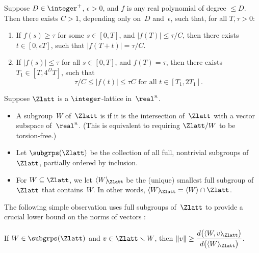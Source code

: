 \begin{lem} \label{ConstsForPolyDiv}
Suppose $D \in \integer^+$, $\epsilon > 0$, and $f$ is any real polynomial of degree $\le D$. 
Then there exists $C > 1$, depending only on~$D$ and~$\epsilon$, such that, for all $T,\tau > 0$:
\noprelistbreak
	\begin{enumerate}
	\item \label{ConstsForPolyDiv-alpha}
	If $f(s) \ge \tau$ for some $s \in [0,T]$, and $|f(T)| \le \tau/C$, then there exists $t \in [0, \epsilon T]$, such that $|f(T + t)| = \tau/C$.
	\item \label{ConstsForPolyDiv-beta}
 	If $|f(s)| \le \tau$ for all $s \in [0,T]$, and $f(T) = \tau$,
	then there exists $T_1 \in [T, 4^D T]$, such that 
		$$ \text{$\tau/C \le |f(t)| \le \tau C $ 
		\ for all $t \in [T_1, 2T_1]$} .$$
	\end{enumerate}
\end{lem}

\begin{notation} 
Suppose  $\Zlatt$ is a $\integer$-lattice in~$\real^n$.
	\begin{itemize}
	\item A subgroup~$W$ of~$\Zlatt$ is  if it is the intersection of~$\Zlatt$ with a vector subspace of~$\real^n$. (This is equivalent to requiring $\Zlatt/W$ to be torsion-free.)
	\item Let $\subgrps(\Zlatt)$ be the collection of all full, nontrivial subgroups of~$\Zlatt$, partially ordered by inclusion.
	\item For $W \subseteq \Zlatt$, we let $\langle W \rangle\!_{\Zlatt}$ be the (unique) smallest full subgroup of~$\Zlatt$ that contains~$W$. In other words, $\langle W \rangle\!_{\Zlatt} = \langle W \rangle \cap \Zlatt$.
	\end{itemize}
\end{notation}

The following simple observation uses full subgroups of~$\Zlatt$ to provide a crucial lower bound on the norms of vectors :

\begin{lem} \label{FullSubgrpLowerBd}
If $W \in \subgrps(\Zlatt)$
	and
	 $v \in \Zlatt \smallsetminus W$,
then\/ 
	$\displaystyle \|v\| \ge \frac{d \bigl( \langle W, v \rangle\!_{\Zlatt}\bigr)}{d \bigl( \langle W \rangle\!_{\Zlatt}\bigr)} $.
\end{lem}

